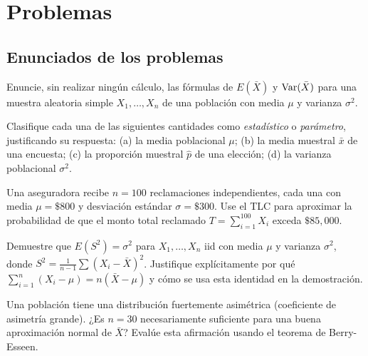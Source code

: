 \section*{Problemas}

\subsection*{Enunciados de los problemas}

\begin{problema}
	\label{prob:22013b6}
	Enuncie, sin realizar ningún cálculo, las fórmulas de $E(\bar{X})$ y $\operatorname{Var}(\bar{X})$ para una muestra aleatoria simple $X_1,\ldots,X_n$ de una población con media $\mu$ y varianza $\sigma^2$.
\end{problema}

\begin{problema}
	\label{prob:f4e7b8b}
	Clasifique cada una de las siguientes cantidades como \emph{estadístico} o \emph{parámetro}, justificando su respuesta: (a) la media poblacional $\mu$; (b) la media muestral $\bar{x}$ de una encuesta; (c) la proporción muestral $\hat{p}$ de una elección; (d) la varianza poblacional $\sigma^2$.
\end{problema}

\begin{problema}
	\label{prob:6815de7}
	Una aseguradora recibe $n=100$ reclamaciones independientes, cada una con media $\mu=\$800$ y desviación estándar $\sigma=\$300$. Use el TLC para aproximar la probabilidad de que el monto total reclamado $T=\sum_{i=1}^{100} X_i$ exceda $\$85{,}000$.
\end{problema}

\begin{problema}
	\label{prob:716e9bb}
	Demuestre que $E(S^2) = \sigma^2$ para $X_1,\ldots,X_n$ iid con media $\mu$ y varianza $\sigma^2$, donde $S^2=\frac{1}{n-1}\sum(X_i-\bar X)^2$. Justifique explícitamente por qué $\sum_{i=1}^n(X_i-\mu) = n(\bar X-\mu)$ y cómo se usa esta identidad en la demostración.
\end{problema}

\begin{problema}
	\label{prob:0555e27}
	Una población tiene una distribución fuertemente asimétrica (coeficiente de asimetría grande). ¿Es $n=30$ necesariamente suficiente para una buena aproximación normal de $\bar X$? Evalúe esta afirmación usando el teorema de Berry-Esseen.
\end{problema}

